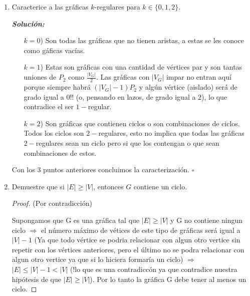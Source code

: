 \documentclass{article}
\begin{document}
\begin{enumerate}
\begin{proof}
        Por lo tanto, se sigue que si $a$ esta en $T_{1}$ entonces está en $T_{2}$.
      \end{proof}

    \item Caracterice a las gr\'aficas $k$-regulares para $k \in \{ 0, 1, 2 \}$.

      \textit{\textbf{Soluci\'on:}}
      \begin{itemize}
        \item[$k = 0$)] Son todas las gráficas que no tienen aristas, a estas se les conoce
          como g\'aficas vac\'ias.

        \item[$k = 1$)] Estas son gr\'aficas con una cantidad de v\'ertices par y son tantas
          uniones de $P_2$ como $\frac{|V_G|}{2}$. Las gráficas con $|V_G|$ impar no entran
          aqu\'i porque siempre habr\'a $(|V_G| - 1) P_2$ y alg\'un v\'ertice (aislado) será
          de grado igual a $0$!! (o, pensando en lazos, de grado igual a 2), lo que contradice
          el ser $1-$regular.

        \item[$k = 2$)] Son gr\'aficas que contienen ciclos o son combinaciones de ciclos.
          Todos los ciclos son $2-$regulares, esto no implica que todas las gr\'aficas
          $2-$regulares sean un ciclo pero si que los contengan o que sean combinaciones
          de estos.
      \end{itemize}
      Con los $3$ puntos anteriores concluimos la caracterización. \hfill $\square$

    \item Demuestre que si $|E| \ge |V|$, entonces $G$ contiene un ciclo.

      \begin{proof} (Por contradicción)

        Supongamos que G es una gráfica tal que $|E|\geq|V|$ y G no contiene ningun ciclo $\Longrightarrow$ el número máximo de vétices de este tipo de gráficas será igual a $|V|-1$ (Ya que todo vértice se podria relacionar con algun otro vertice sin repetir con los vértices anteriores, pero el último no se podra relacionar con algun otro vertice ya que si lo hiciera formaría un ciclo) $\Longrightarrow$ $|E|\leq|V|-1 < |V|$ (!lo que es una contradiccón ya que contradice nuestra hipótesis de que $|E|\geq|V|$). Por lo tanto la gráfica G debe tener al menos un ciclo.

        \end{proof}
  \end{enumerate}
\end{document}
